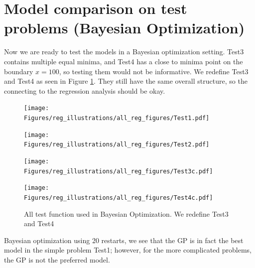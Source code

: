 \section{Model comparison on test problems (Bayesian Optimization)}
Now we are ready to test the models in a Bayesian optimization setting. Test3 contains multiple
equal minima, and Test4 has a close to minima point on the boundary $x=100$, so testing them would
not be informative. We redefine Test3 and Test4 as seen in Figure \ref{TEST_problems2}. They still
have the same overall structure, so the connecting to the regression analysis should be okay. 

\begin{figure}[h]
  \centering
  \begin{minipage}[b]{0.24\textwidth}
   \texttt{[image: Figures/reg\_illustrations/all\_reg\_figures/Test1.pdf]}
  \end{minipage}
  \hfill
  \begin{minipage}[b]{0.24\textwidth}
    \texttt{[image: Figures/reg\_illustrations/all\_reg\_figures/Test2.pdf]}
   \end{minipage}
   \hfill
   \begin{minipage}[b]{0.24\textwidth}
    \texttt{[image: Figures/reg\_illustrations/all\_reg\_figures/Test3c.pdf]}
   \end{minipage}
   \hfill
   \begin{minipage}[b]{0.24\textwidth}
     \texttt{[image: Figures/reg\_illustrations/all\_reg\_figures/Test4c.pdf]}
    \end{minipage}
  \caption{All test function used in Bayesian Optimization. We redefine Test3 and Test4}
  \label{TEST_problems2}
\end{figure}


Bayesian optimization using 20 restarts, we see that the GP is in fact the best model in the simple
problem Test1; however, for the more complicated problems, the GP is not the preferred model.

